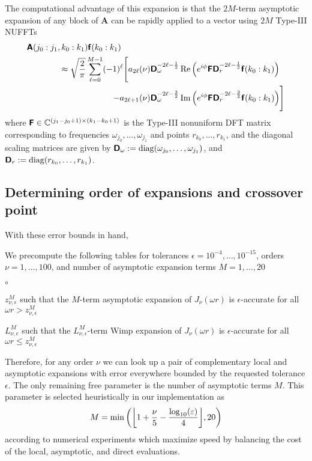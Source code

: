 The computational advantage of this expansion is that the $2M$-term asymptotic
expansion of any block of $\bm{A}$ can be rapidly applied to a vector using $2M$
Type-III NUFFTs
\begin{align}
    \mtx{A}(j_0:j_1, k_0:k_1) \vct{f}(k_0:k_1) \hspace*{0.2\textwidth}& \\
    \approx \sqrt{\frac{2}{\pi}} \sum_{\ell=0}^{M-1} (-1)^\ell \Bigg[ 
        a_{2\ell}(\nu) \mtx{D}_\omega^{-2\ell-\frac{1}{2}} &\Re\Big(e^{i\phi} \mtx{F} \mtx{D}_r^{-2\ell-\frac{1}{2}} \vct{f}(k_0:k_1)\Big) \\
        - a_{2\ell+1}(\nu) \mtx{D}_\omega^{-2\ell-\frac{3}{2}} &\Im\Big(e^{i\phi} \mtx{F} \mtx{D}_r^{-2\ell-\frac{3}{2}} \vct{f}(k_0:k_1)\Big) 
    \Bigg]
\end{align}
where $\bm{\mathsf{F}} \in \mathbb{C}^{(j_1 - j_0 + 1) \times (k_1 - k_0 + 1)}$ is the Type-III
nonuniform DFT matrix corresponding to frequencies $\omega_{j_0}, \dots,
\omega_{j_1}$ and points $r_{k_0}, \dots, r_{k_1}$, and the diagonal scaling
matrices are given by $\bm{\mathsf{D}}_\omega :=
\operatorname{diag}(\omega_{j_0},\dots,\omega_{j_1})$, and $\bm{\mathsf{D}}_r :=
\operatorname{diag}(r_{k_0},\dots,r_{k_1})$.

\subsection{Determining order of expansions and crossover point}
\label{sec:cutoff}

With these error bounds in hand, 

We precompute the following tables for tolerances $\epsilon = 10^{-4}, \dots,
10^{-15}$, orders $\nu = 1, \dots, 100$, and number of asymptotic expansion
terms $M = 1, \dots, 20$
\begin{list}{$\circ$}{}
    \item $z_{\nu, \epsilon}^M$ such that the $M$-term asymptotic expansion of
    $J_\nu(\omega r)$ is $\epsilon$-accurate for all $\omega r > z_{\nu,
    \epsilon}^M$
    \item $L_{\nu, \epsilon}^M$ such that the $L_{\nu, \epsilon}^M$-term Wimp
    expansion of $J_\nu(\omega r)$ is $\epsilon$-accurate for all $\omega r \leq
    z_{\nu, \epsilon}^M$
\end{list}
Therefore, for any order $\nu$ we can look up a pair of complementary local and
asymptotic expansions with error everywhere bounded by the requested tolerance
$\epsilon$. The only remaining free parameter is the number of asymptotic terms
$M$. This parameter is selected heuristically in our implementation as 
\begin{align} \label{eq:num-asy-terms}
    M = \min\left(\flr{1 + \frac{\nu}{5} - \frac{\log_{10}(\epsilon)}{4}}, 20\right)
\end{align}
according to numerical experiments which maximize speed by balancing the cost of
the local, asymptotic, and direct evaluations.




